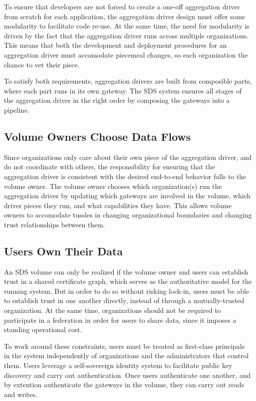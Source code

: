 To ensure that developers
are not forced to create a one-off aggregation driver from scratch for each
application, the aggregation driver design must offer some modularity to
facilitate code re-use.  At the same time, the need for modularity is driven by
the fact that the aggregation driver runs across multiple organizations.
This means that both the development and deployment procedures for
an aggregation driver must accomodate piecemeal
changes, so each organization the chance to vet their piece.

To satisfy both requirements, aggregation drivers
are built from composible parts, where each part runs in its own gateway.
The SDS system ensures all stages of the aggregation driver in the right order
by composing the gateways into a pipeline.

\subsection{Volume Owners Choose Data Flows}

Since organizations only care about their own piece of the aggregation driver,
and do not coordinate with others, the responsibility for ensuring that the
aggregation driver is consistent with the desired end-to-end behavior falls to
the volume owner.  The volume owner chooses which
organization(s) run the aggregation driver by updating which gateways are
involved in the volume, which driver pieces they run, and what capabilities they
have.  This allows volume owners to accomodate tussles in changing
organizational boundaries and changing trust relationships between them.

\subsection{Users Own Their Data}

An SDS volume can only be realized if the volume owner and users can establish
trust in a shared certificate graph, which serves as the authoritative model for
the running system.  But in order to do so without risking lock-in, users must
be able to establish trust in one another directly, instead of through a
mutually-trusted organization.  At the same time, organizations should not be
required to participate in a federation in order for users to share data, since
it imposes a standing operational cost.

To work around these constraints, users must be treated
as first-class principals in the system independently of organizations
and the administrators that control them.  Users leverage a self-sovereign identity
system to facilitate public key discovery and carry out authentication.  Once
users authenticate one another, and by extention authenticate the gateways in
the volume, they can carry out reads and writes.

